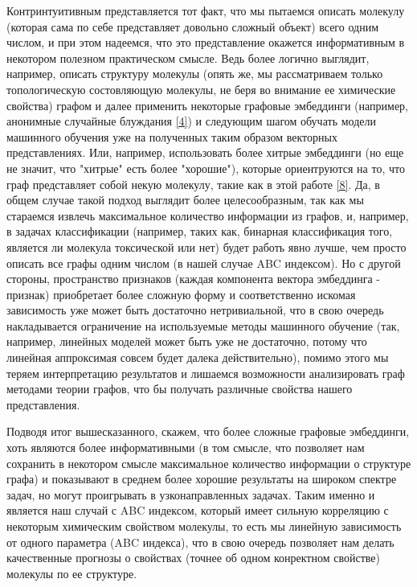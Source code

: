 \documentclass{article}
\begin{document}
Контринтуитивным представляется тот факт, что мы пытаемся описать молекулу (которая сама по себе представляет довольно сложный объект) всего одним числом, и при этом надеемся, что это представление окажется информативным в некотором полезном практическом смысле. Ведь более логично выглядит, например, описать структуру молекулы (опять же, мы рассматриваем только топологическую состовляющую молекулы, не беря во внимание ее химические свойства) графом и далее применить некоторые графовые эмбеддинги (например, анонимные случайные блуждания \hyperlink{random_walk}{[4]}) и следующим шагом обучать модели машинного обучения уже на полученных таким образом векторных представлениях. Или, например, использовать более хитрые эмбеддинги (но еще не значит, что "хитрые" есть более "хорошие"), которые ориентруются на то, что граф представляет собой некую молекулу, такие как в этой работе \hyperlink{molecular_embedding}{[8]}. Да, в общем случае такой подход выглядит более целесообразным, так как мы стараемся извлечь максимальное количество информации из графов, и, например, в задачах классификации (например, таких как, бинарная классификация того, является ли молекула токсической или нет) будет работь явно лучше, чем просто описать все графы одним числом (в нашей случае ABC индексом). Но с другой стороны, пространство признаков (каждая компонента вектора эмбеддинга - признак) приобретает более сложную форму и соответственно искомая зависимость уже может быть достаточно нетривиальной, что в свою очередь накладывается ограничение на используемые методы машинного обучение (так, например, линейных моделей может быть уже не достаточно, потому что линейная аппроксимая совсем будет далека действительно), помимо этого мы теряем интерпретацию результатов и  лишаемся возможности анализировать граф методами теории графов, что бы получать различные свойства нашего представления. 

Подводя итог вышесказанного, скажем, что более сложные графовые эмбеддинги, хоть являются более информативными (в том смысле, что позволяет нам сохранить в некотором смысле максимальное количество информации о структуре графа) и показывают в среднем более хорошие результаты на широком спектре задач, но могут проигрывать в узконаправленных задачах. Таким именно и является наш случай с  ABC индексом, который имеет сильную корреляцию с некоторым химическим свойством молекулы, то есть мы линейную зависимость от одного параметра (ABC индекса), что в свою очередь позволяет нам делать качественные прогнозы о свойствах (точнее об одном конректном свойстве) молекулы по ее структуре.
\end{document}
